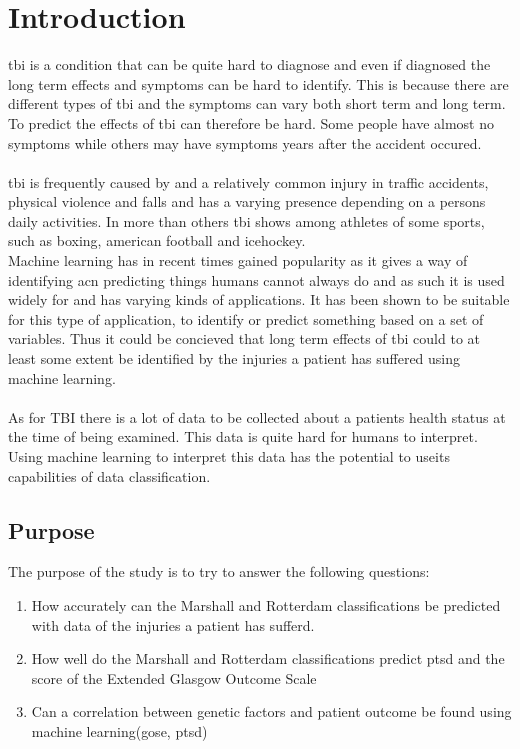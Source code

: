 \documentclass[11pt]{article}
\begin{document}
\newpage
\tableofcontents
\newpage
\section{Introduction}
 \gls{tbi} is a condition that can be quite hard to diagnose and even if diagnosed the long term effects and symptoms can be hard to identify. This is because there are different types of \gls{tbi} and the symptoms can vary both short term and long term. To predict the effects of \gls{tbi} can therefore be hard. Some people have almost no symptoms while others may have symptoms years after the accident occured.\cite{TraumaticBrainInjury2021}\cite{TraumaticBrainInjury}\\
\\
\gls{tbi} is frequently caused by and a relatively common injury in traffic accidents, physical violence and falls and has a varying presence depending on a persons daily activities. In more than others \gls{tbi} shows among athletes of some sports, such as boxing, american football and icehockey\cite{TraumaticBrainInjury}.\cite{TraumaticBrainInjury2021}
\\
Machine learning has in recent times gained popularity as it gives a way of identifying acn predicting things humans cannot always do and as such it is used widely for and has varying kinds of applications. It has been shown to be suitable for this type of application, to identify or predict something based on a set of variables. Thus it could be concieved that long term effects of \gls{tbi} could to at least some extent be identified by the injuries a patient has suffered using machine learning.\cite{ArtificialIntelligence2021a}\cite{MachineLearning2021}\\
\\
As for \gls{TBI} there is a lot of data to be collected about a patients health status at the time of being examined. This data is quite hard for humans to interpret. Using machine learning to interpret this data has the potential to useits capabilities of data classification.\cite{TraumaticBrainInjury2021}\cite{nielsonUncoveringPrecisionPhenotypebiomarker2017}

\subsection{Purpose}
The purpose of the study is to try to answer the following questions:

\begin{enumerate}
  \item{How accurately can the Marshall and Rotterdam classifications be predicted with data of the injuries a patient has sufferd.}
  \item{How well do the Marshall and Rotterdam classifications predict \gls{ptsd} and the score of the Extended Glasgow Outcome Scale}
  \item{Can a correlation between genetic factors and patient outcome be found using machine learning(\gls{gose}, \gls{ptsd})}
\end{enumerate}
\end{document}
